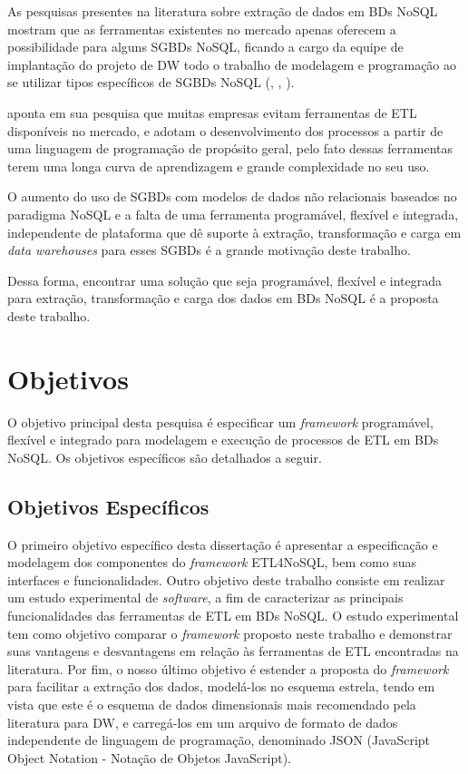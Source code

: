 As pesquisas presentes na literatura sobre extração de dados em BDs NoSQL mostram que as ferramentas existentes no mercado apenas oferecem a possibilidade para alguns SGBDs NoSQL, ficando a cargo da equipe de implantação do projeto de DW todo o trabalho de modelagem e programação ao se utilizar tipos específicos de SGBDs NoSQL (\cite{silva:2016}, \cite{chevalier:2015}, \cite{liu:2013}).

\cite{silva:2012} aponta em sua pesquisa que muitas empresas evitam ferramentas de ETL disponíveis no mercado, e adotam o desenvolvimento dos processos a partir de uma linguagem de programação de propósito geral, pelo fato dessas ferramentas terem uma longa curva de aprendizagem e grande complexidade no seu uso.

O aumento do uso de SGBDs com modelos de dados não relacionais baseados no paradigma NoSQL e a falta de uma ferramenta programável, flexível e integrada, independente de plataforma que dê suporte à extração, transformação e carga em \textit{data warehouses} para esses SGBDs é a grande motivação deste trabalho.

Dessa forma, encontrar uma solução que seja programável, flexível e integrada para extração, transformação e carga dos dados em BDs NoSQL é a proposta deste trabalho.





\section{Objetivos}

O objetivo principal desta pesquisa é especificar um \textit{framework} programável, flexível e integrado para modelagem e execução de processos de ETL em BDs NoSQL. Os objetivos específicos são detalhados a seguir.

\subsection{Objetivos Específicos}

O primeiro objetivo específico desta dissertação é apresentar a especificação e modelagem dos componentes do \textit{framework} ETL4NoSQL, bem como suas interfaces e funcionalidades. Outro objetivo deste trabalho consiste em realizar um estudo experimental de \textit{software}, a fim de caracterizar as principais funcionalidades das ferramentas de ETL em BDs NoSQL. O estudo experimental tem como objetivo comparar o \textit{framework} proposto neste trabalho e demonstrar suas vantagens e desvantagens em relação às ferramentas de ETL encontradas na literatura. Por fim, o nosso último objetivo é estender a proposta do \textit{framework} para facilitar a extração dos dados, modelá-los no esquema estrela, tendo em vista que este é o esquema de dados dimensionais mais recomendado pela literatura para DW, e carregá-los em um arquivo de formato de dados independente de linguagem de programação, denominado JSON (JavaScript Object Notation - Notação de Objetos JavaScript).

